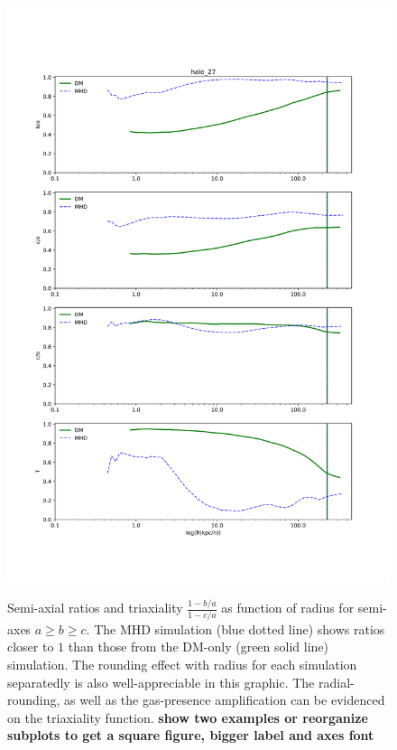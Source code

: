 \begin{figure}
\centering
{\includegraphics[width=1\columnwidth]{./pics/MHD_Vs_DM/level4_halo_27_DM_Vs_MHD.png}\label{fig:outterMHD}}
\caption{Semi-axial ratios and triaxiality $\frac{1-b/a}{1-c/a}$ as function of radius for semi-axes $a\geq b\geq c$. The MHD simulation (blue dotted line) shows ratios closer to $1$ than those from the DM-only (green solid line) simulation. The rounding effect with radius for each simulation separatedly is also well-appreciable in this graphic. The radial-rounding, as well as the gas-presence amplification can be evidenced on the triaxiality function. \textbf{show two examples or reorganize subplots to get a square figure, bigger label and axes font}}
\end{figure} 

